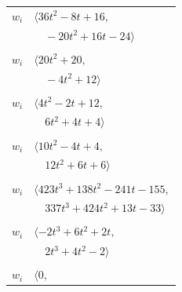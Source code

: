 \documentclass[11pt]{article}
\begin{document}
\begin{longtable}{@{}ll@{}}
$w_i$ & $\langle 36t^{2}-8t+16,$\\
 & $\quad -20t^{2}+16t-24\rangle$\\
\addlinespace[2pt]
\multicolumn{2}{@{}p{0.97\textwidth}@{}}{$i=17$, $D_i=4$, $\rho_{ij}$: $2{:}1, \allowbreak 3{:}1, \allowbreak 6{:}1, \allowbreak 8{:}1, \allowbreak 10{:}2, \allowbreak 28{:}2, \allowbreak 33{:}1, \allowbreak 37{:}2$}\\
$w_i$ & $\langle 20t^{2}+20,$\\
 & $\quad -4t^{2}+12\rangle$\\
\addlinespace[2pt]
\multicolumn{2}{@{}p{0.97\textwidth}@{}}{$i=18$, $D_i=2$, $\rho_{ij}$: $1{:}1, \allowbreak 6{:}1, \allowbreak 9{:}2, \allowbreak 22{:}1, \allowbreak 24{:}2, \allowbreak 28{:}2, \allowbreak 41{:}1$}\\
$w_i$ & $\langle 4t^{2}-2t+12,$\\
 & $\quad 6t^{2}+4t+4\rangle$\\
\addlinespace[2pt]
\multicolumn{2}{@{}p{0.97\textwidth}@{}}{$i=19$, $D_i=2$, $\rho_{ij}$: $0{:}2, \allowbreak 10{:}1, \allowbreak 13{:}1, \allowbreak 23{:}2, \allowbreak 26{:}2, \allowbreak 28{:}2, \allowbreak 33{:}1, \allowbreak 36{:}1$}\\
$w_i$ & $\langle 10t^{2}-4t+4,$\\
 & $\quad 12t^{2}+6t+6\rangle$\\
\addlinespace[2pt]
\multicolumn{2}{@{}p{0.97\textwidth}@{}}{$i=20$, $D_i=8$, $\rho_{ij}$: $2{:}2, \allowbreak 4{:}2, \allowbreak 5{:}2, \allowbreak 11{:}1, \allowbreak 16{:}2, \allowbreak 25{:}2, \allowbreak 26{:}2, \allowbreak 30{:}2, \allowbreak 32{:}1, \allowbreak 41{:}2$}\\
$w_i$ & $\langle 423t^{3}+138t^{2}-241t-155,$\\
 & $\quad 337t^{3}+424t^{2}+13t-33\rangle$\\
\addlinespace[2pt]
\multicolumn{2}{@{}p{0.97\textwidth}@{}}{$i=21$, $D_i=2$, $\rho_{ij}$: $0{:}2, \allowbreak 1{:}1, \allowbreak 7{:}1, \allowbreak 16{:}1, \allowbreak 23{:}1, \allowbreak 33{:}2, \allowbreak 35{:}1$}\\
$w_i$ & $\langle -2t^{3}+6t^{2}+2t,$\\
 & $\quad 2t^{3}+4t^{2}-2\rangle$\\
\addlinespace[2pt]
\multicolumn{2}{@{}p{0.97\textwidth}@{}}{$i=22$, $D_i=2$, $\rho_{ij}$: $8{:}1, \allowbreak 16{:}1, \allowbreak 18{:}2, \allowbreak 24{:}1, \allowbreak 29{:}1, \allowbreak 36{:}2$}\\
$w_i$ & $\langle 0,$\\

\end{longtable}
\end{document}
